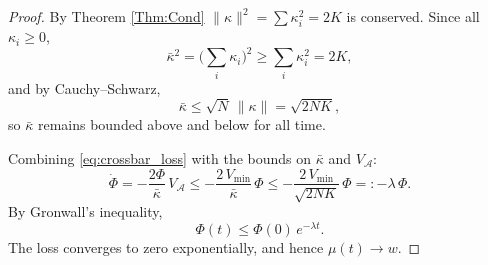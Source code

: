 \documentclass[10pt,a4paper]{amsart}
\begin{document}
\begin{proof}
By Theorem \ref{Thm:Cond} 
$\|\kappa\|^2 = \sum \kappa_i^2 = 2K$ is conserved.
Since all $\kappa_i \geq 0$,
\[
\bar{\kappa}^2 = \Big(\sum_i \kappa_i\Big)^2
\geq \sum_i \kappa_i^2 = 2K,
\]
and by Cauchy--Schwarz,
\[
\bar{\kappa} \leq \sqrt{N}\,\|\kappa\| = \sqrt{2NK},
\]
so $\bar{\kappa}$ remains bounded above and below for all time.

Combining \eqref{eq:crossbar_loss} with the bounds on $\bar{\kappa}$ and
$V_{\mathcal{A}}$:
\begin{equation}
\label{eq:Phi_dot_crossbar}
\dot{\Phi}
= -\dfrac{2\Phi}{\bar{\kappa}}\, V_{\mathcal{A}}
\leq -\dfrac{2\,V_{\min}}{\bar{\kappa}}\,\Phi
\leq -\dfrac{2\,V_{\min}}{\sqrt{2NK}}\,\Phi
=: -\lambda\,\Phi.
\end{equation}
By Gronwall's inequality,
\[
\Phi(t) \leq \Phi(0)\, e^{-\lambda t}.
\]
The loss converges to zero exponentially, and hence $\mu(t) \to w$.
\end{proof}
\end{document}
